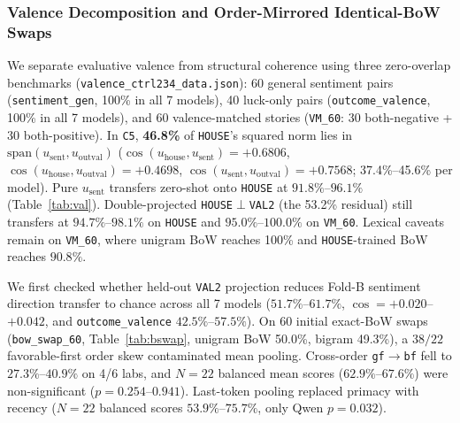 \documentclass[conference]{IEEEtran}
\begin{document}
\subsubsection{Valence Decomposition and Order-Mirrored Identical-BoW Swaps}
\label{sec:val}
We separate evaluative valence \cite{tigges2023linear} from structural coherence using three zero-overlap benchmarks (\texttt{valence\_ctrl234\_data.json}): 60 general sentiment pairs (\texttt{sentiment\_gen}, 100\% in all 7 models), 40 luck-only pairs (\texttt{outcome\_valence}, 100\% in all 7 models), and 60 valence-matched stories (\texttt{VM\_60}: 30 both-negative + 30 both-positive). In \texttt{C5}, \textbf{46.8\%} of \texttt{HOUSE}'s squared norm lies in $\text{span}(u_{\text{sent}}, u_{\text{outval}})$ ($\cos(u_{\text{house}}, u_{\text{sent}})=+0.6806$, $\cos(u_{\text{house}}, u_{\text{outval}})=+0.4698$, $\cos(u_{\text{sent}}, u_{\text{outval}})=+0.7568$; 37.4\%--45.6\% per model). Pure $u_{\text{sent}}$ transfers zero-shot onto \texttt{HOUSE} at $91.8\%$--$96.1\%$ (Table~\ref{tab:val}). Double-projected \texttt{HOUSE}$\perp$\texttt{VAL2} (the 53.2\% residual) still transfers at $94.7\%$--$98.1\%$ on \texttt{HOUSE} and $95.0\%$--$100.0\%$ on \texttt{VM\_60}. Lexical caveats remain on \texttt{VM\_60}, where unigram BoW reaches 100\% and \texttt{HOUSE}-trained BoW reaches $90.8\%$.

We first checked whether held-out \texttt{VAL2} projection reduces Fold-B sentiment direction transfer to chance across all 7 models ($51.7\%$--$61.7\%$, $\cos=+0.020$--$+0.042$, and \texttt{outcome\_valence} $42.5\%$--$57.5\%$). On 60 initial exact-BoW swaps (\texttt{bow\_swap\_60}, Table~\ref{tab:bswap}, unigram BoW 50.0\%, bigram 49.3\%), a $38/22$ favorable-first order skew contaminated mean pooling. Cross-order \texttt{gf}$\to$\texttt{bf} fell to $27.3\%$--$40.9\%$ on 4/6 labs, and $N=22$ balanced mean scores ($62.9\%$--$67.6\%$) were non-significant ($p=0.254$--$0.941$). Last-token pooling replaced primacy with recency ($N=22$ balanced scores $53.9\%$--$75.7\%$, only Qwen $p=0.032$).
\end{document}
